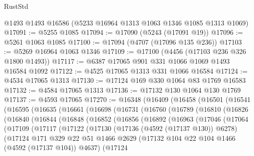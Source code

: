 \begin{lexlean}{RustStd}
\begin{coremodule}
    @1493
    @1493
    @16586
    (@5233 @16964 @1313 @1063 @1346 @1085 @1313 @1069)
@17091 := @5255 @1085
@17094 := @17090 (@5243 (@17091 @19))
@17096 := @5261 @1063 @1085
@17100 := @17094 (@4707 (@17096 @135 @236))
@17103 := @5269 @16964 @1063 @1346
@17109 := @17100 (@4456 (@17103 @236 @326 @1800 @1493))
@17117 := @6387 @17065 @901 @331 @1066 @1069 @1493 @16584 @1092
@17122 := @4525 @17065 @1313 @331 @1066 @16584
@17124 := @4534 @17065 @1313
@17130 := @17124 @169 @330 @1064 @83 @1769 @16583
@17132 := @4584 @17065 @1313
@17136 := @17132 @130 @1064 @130 @1769
@17137 := @4593 @17065
@17270 := @16348
    (@16409
      (@16458
        (@16501
          (@16541
            (@16595
              (@16635
                (@16661
                  (@16698
                    (@16731
                      (@16760
                        (@16789
                          (@16810
                            (@16826
                              (@16840
                                (@16844
                                  (@16848
                                    (@16852
                                      (@16856
                                        (@16892
                                          (@16963
                                            (@17046
                                              (@17064
                                                (@17109
                                                  (@17117
                                                    (@17122
                                                      (@17130
                                                        (@17136 (@4592 (@17137 @130)) @6278)
                                                        (@17124
                                                          @171
                                                          @329
                                                          @22
                                                          @51
                                                          @1466
                                                          @2629
                                                          (@17132
                                                            @104
                                                            @22
                                                            @104
                                                            @1466
                                                            (@4592 (@17137 @104))
                                                            @4637)
                                                          (@17124

\end{coremodule}
\end{lexlean}
